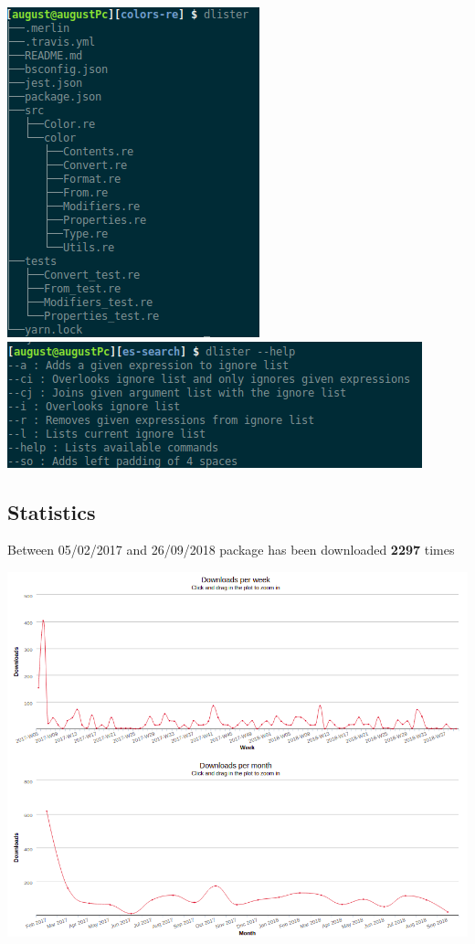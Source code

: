 \documentclass{article}
\begin{document}
\begin{multicols}{2}
  \includegraphics[scale=0.5]{dlister_use.png}
  \includegraphics[scale=0.8]{dlister_help.png}
\end{multicols}

\subsection{Statistics}
\begin{flushleft}
Between 05/02/2017 and 26/09/2018 package has been downloaded \textbf{2297} times
\end{flushleft}

\begin{center}
  \includegraphics[scale=0.4]{dlister.png}
\end{center}

\pagebreak
\end{document}
